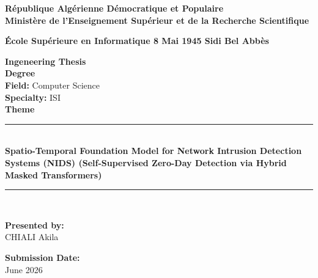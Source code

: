 \documentclass[12pt, a4paper]{report}
\begin{document}
\begin{titlepage}
    \begin{center}
        \linespread{1}
        \small
        \textbf{République Algérienne Démocratique et Populaire}\\
        
        \vspace{0.2cm}
        \textbf{Ministère de l'Enseignement Supérieur et de la Recherche Scientifique}\\
       
        \vspace{0.2cm}
        
        \textbf{École Supérieure en Informatique 8 Mai 1945 Sidi Bel Abbès}\\

       
        \vspace{0.3cm}
        
        
        
        {\Huge \textbf{Ingeneering Thesis}}\\[0.5cm] 
        {\large \textbf{Degree}}\\[0.2cm] 
        \textbf{Field:} Computer Science\\
        \textbf{Specialty:} ISI\\[1cm]
        
        \large \textbf{Theme}\\
        \vspace{0.2cm}
        
        \rule{\linewidth}{0.5mm} \\[0.4cm]
        {\Large \bfseries Spatio-Temporal Foundation Model for Network Intrusion Detection Systems (NIDS) (Self-Supervised Zero-Day Detection via Hybrid Masked Transformers)} \\[0.4cm]
        \rule{\linewidth}{0.5mm} \\[1.5cm]
        
        \begin{minipage}{0.4\textwidth}
            \begin{flushleft} \large
                \textbf{Presented by:}\\
                CHIALI Akila
            \end{flushleft}
        \end{minipage}
        \hfill
        \begin{minipage}{0.4\textwidth}
            \begin{flushright} \large
                \textbf{Submission Date:}\\
                June 2026 
            \end{flushright}
        \end{minipage}
        

\end{center}
\end{titlepage}
\end{document}
